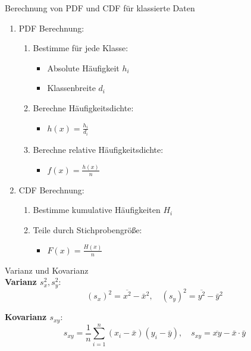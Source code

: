 \begin{KR}{Berechnung von PDF und CDF für klassierte Daten}
\begin{enumerate}
    \item PDF Berechnung:
        \begin{enumerate}
            \item Bestimme für jede Klasse:
                \begin{itemize}
                    \item Absolute Häufigkeit $h_i$
                    \item Klassenbreite $d_i$
                \end{itemize}
            \item Berechne Häufigkeitsdichte:
                \begin{itemize}
                    \item $h(x) = \frac{h_i}{d_i}$
                \end{itemize}
            \item Berechne relative Häufigkeitsdichte:
                \begin{itemize}
                    \item $f(x) = \frac{h(x)}{n}$
                \end{itemize}
        \end{enumerate}
    \item CDF Berechnung:
        \begin{enumerate}
            \item Bestimme kumulative Häufigkeiten $H_i$
            \item Teile durch Stichprobengröße:
                \begin{itemize}
                    \item $F(x) = \frac{H(x)}{n}$
                \end{itemize}
        \end{enumerate}
\end{enumerate}
\end{KR}

\begin{definition}{Varianz und Kovarianz}\\
\textbf{Varianz $s_x^2, s_y^2$}:
$$(s_x)^2 = \overline{x^2} - \bar{x}^2, \quad (s_y)^2 = \overline{y^2} - \bar{y}^2$$

\textbf{Kovarianz $s_{xy}$}:
$$s_{xy} = \frac{1}{n}\sum_{i=1}^{n}(x_i - \bar{x})(y_i - \bar{y}), \quad s_{xy} = \overline{xy} - \bar{x} \cdot \bar{y}$$
\end{definition}

